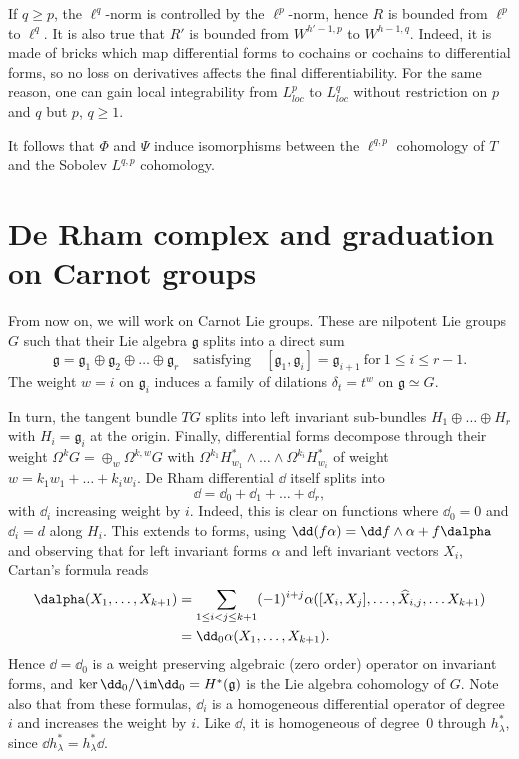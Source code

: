 If $q\geq p$, the $\ell^q$-norm is controlled by the $\ell^p$-norm, hence $R$ is bounded from $\ell^p$ to $\ell^q$. It is also true that $R'$ is bounded from $W^{h'-1,p}$ to $W^{h-1,q}$. Indeed, it is made of bricks which map differential forms to cochains or cochains to differential forms, so no loss on derivatives affects the final differentiability. For the same reason, one can gain local integrability from $L^p_{loc}$ to $L^q_{loc}$ without restriction on $p$ and $q$ but $p$, $q\geq 1$.

It follows that $\Phi$ and $\Psi$ induce isomorphisms between the $\ell^{q,p}$ cohomology of $T$ and the Sobolev $L^{q,p}$ cohomology.


\section{De Rham complex and graduation on Carnot groups}\label{sec:dc_complex}

From now on, we will work on Carnot Lie groups. These are nilpotent Lie groups $G$ such that their Lie algebra $\mathfrak{g}$ splits into a direct sum
\[
\mathfrak{g} = \mathfrak{g}_1 \oplus \mathfrak{g}_2 \oplus \dots
\oplus\mathfrak{g}_r \quad \mathrm{satisfying} \quad [\mathfrak{g}_1,
\mathfrak{g}_i] = \mathfrak{g}_{i+1} \ \mathrm{for} \ 1\leq i \leq r-1.
\]
The weight $w = i$ on $\mathfrak{g}_i$ induces a family of dilations $\delta_t = t^w$ on $\mathfrak{g} \simeq G$.

In turn, the tangent bundle $TG$ splits into left invariant sub-bundles $H_1 \oplus \dots \oplus H_r$ with $H_i = \mathfrak{g}_i$ at the origin. Finally, differential forms decompose through their weight $\Omega^k G = \oplus_w \Omega^{k,w} G$ with $\Omega^{k_1} H^*_{w_1}\wedge \dots \wedge \Omega^{k_i}H^*_{w_i}$ of weight $w = k_1 w_1 + \dots + k_i w_i$. De Rham differential $\dd$ itself splits into
\[
\dd = \dd_0 + \dd_1 + \dots + \dd_r,
\]
with $\dd_i$ increasing weight by $i$. Indeed, this is clear on functions where $\dd_0 = 0$ and $\dd_i = d $ along $H_i$. This extends to forms, using $\dd(f\alpha) = \dd f \wedge \alpha + f \dalpha$ and observing that for left invariant forms $\alpha$ and left invariant vectors $X_i$, Cartan's formula reads
\begin{align*}
\dalpha (X_1,\dots, X_{k+1}) & = \sum_{1\leq i < j\leq k+1} (-1)^{i+j}
\alpha ([X_i,X_j], \dots, \widehat{X}_{i,j},
\dots X_{k+1}) \\
& = \dd_0 \alpha (X_1,\dots, X_{k+1}).
\end{align*}
Hence $\dd= \dd_0$ is a weight preserving algebraic (zero order) operator on invariant forms, and $\ker \dd_0 / \im \dd_0 = H^*(\mathfrak{g})$ is the Lie algebra cohomology of $G$. Note also that from these formulas, $\dd_i$ is a homogeneous differential operator of degree~$i$ and increases the weight by $i$. Like $\dd$, it is homogeneous of degree~$0$ through $h^*_\lambda$, since $\dd h^*_\lambda = h^*_\lambda \dd$.

